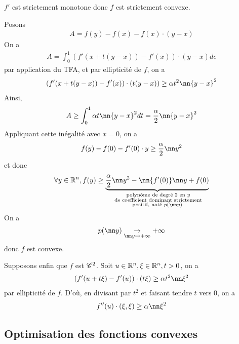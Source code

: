 \documentclass[french,a4paper,10pt]{article}
\begin{document}
	\begin{myproof}
		$f'$ est strictement monotone donc $f$ est strictement convexe.
		
		Posons 
			\[\begin{aligned}
				A=f(y)-f(x)-f(x)\cdot(y-x)
			\end{aligned}\]
		On a
			\[\begin{aligned}
				A=\int_0^1 (f'(x+t(y-x))-f'(x))\cdot(y-x)de
			\end{aligned}\]
		par application du TFA, et par ellipticité de $f$, on a
			\[\begin{aligned}
				(f'(x+t(y-x))-f'(x))\cdot(t(y-x))\ge\alpha t^2\nn{y-x}^2
			\end{aligned}\]
		Ainsi, 
			\[\begin{aligned}
				A\ge \int_0^1 \alpha t\nn{y-x}^2 dt=\frac\alpha2\nn{y-x}^2
			\end{aligned}\]
		Appliquant cette inégalité avec $x=0$, on a
			\[\begin{aligned}
				f(y)-f(0)-f'(0)\cdot y\ge\frac\alpha2\nn y^2
			\end{aligned}\]
		et donc
			\[\begin{aligned}
				\forall y\in\bb R^n,f(y)\ge\underbrace{\frac\alpha2\nn y^2-\nn{f'(0)}\nn y+f(0)}_{\substack{\text{ polynôme de degré }2\text{ en }y\\\text{ de coefficient dominant strictement}\\ \text{positif, noté }p(\nn y)}}
			\end{aligned}\]
		On a 
			\[\begin{aligned}
				p(\nn y)\underset{\nn y\to+\infty}\to+\infty
			\end{aligned}\]
		donc $f$ est convexe.
		
		Supposons enfin que $f$ est $\mathscr{C}^2$. Soit $u\in\mathbb{R}^n,\xi\in\mathbb{R}^n,t>0$, on a
			\[\begin{aligned}
				(f'(u+t\xi)-f'(u))\cdot(t\xi)\ge\alpha t^2\nn\xi^2
			\end{aligned}\]
		par ellipticité de $f$. D'où, en divisant par $t^2$ et faisant tendre $t$ vers 0, on a
			\[\begin{aligned}
				f''(u)\cdot(\xi,\xi)\ge\alpha \nn\xi^2
			\end{aligned}\]
	\end{myproof}
	
	\subsection{Optimisation des fonctions convexes}
	
\end{document}
